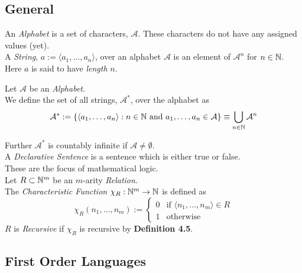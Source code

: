 \documentclass[11pt,a4paper]{article}
\begin{document}
\subsection{General}

An \textit{Alphabet} is a set of characters, $\mathcal{A}$. These characters do not have any assigned values (yet).\\

A \textit{String}, $a:=\langle a_1,\dots,a_n\rangle$, over an alphabet $\mathcal{A}$ is an element of $\mathcal{A}^n$ for $n\in\mathbb{N}$.\\
Here $a$ is said to have \textit{length} $n$.\\


Let $\mathcal{A}$ be an \textit{Alphabet}.\\
We define the set of all strings, $\mathcal{A}^*$, over the alphabet as
$$\mathcal{A}^*:=\{\langle a_1,\dots,a_n\rangle:n\in\mathbb{N}\text{ and }a_1,\dots,a_n\in\mathcal{A}\}\equiv\bigcup\limits_{n\in\mathbb{N}}\mathcal{A}^n$$

Further $\mathcal{A}^*$ is countably infinite if $\mathcal{A}\neq\emptyset$.\\

A \textit{Declarative Sentence} is a sentence which is either true or false.\\
\nb These are the focus of mathematical logic.\\

Let $R\subset\mathbb{N}^m$ be an $m$-arity \textit{Relation}.\\
The \textit{Characteristic Function} $\chi_R:\mathbb{N}^m\to\mathbb{N}$ is defined as
\[\chi_R(n_1,\dots,n_m):=\begin{cases}0&\text{if }\langle n_1,\dots,n_m\rangle\in R\\1&\text{otherwise}\end{cases}\]
\nb $R$ is \textit{Recursive} if $\chi_R$ is recursive by \textbf{Definition 4.5}.

\subsection{First Order Languages}
\end{document}
